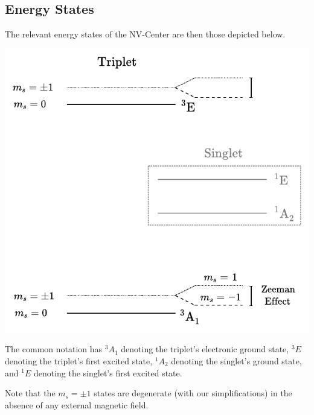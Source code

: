 \documentclass[10pt,a4paper]{article}
\begin{document}
\begin{multicols}{2}
\subsection{Energy States}
The relevant energy states of the NV-Center are then those depicted below.
\begin{center}
\includegraphics[scale=0.72]{energy_raw_inline.pdf}
\end{center}
The common notation has $^3A_1$ denoting the triplet's electronic ground state, $^3E$ denoting the triplet's first excited state, $^1A_2$ denoting the singlet's ground state, and $^1 E$ denoting the singlet's first excited state.

Note that the $m_s=\pm 1$ states are degenerate (with our simplifications) in the absence of any external magnetic field.


\end{multicols}
\end{document}
